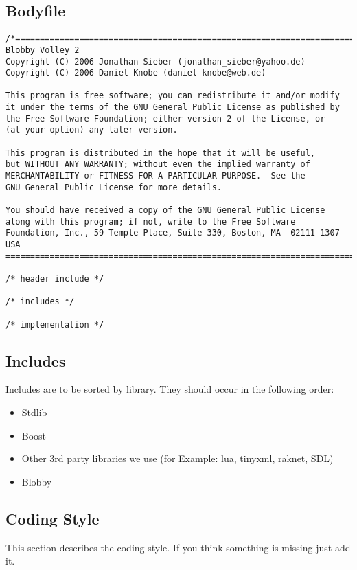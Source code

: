 \documentclass[a4paper]{scrartcl}
\begin{document}
\subsection{Bodyfile}

\begin{lstlisting}
/*=============================================================================
Blobby Volley 2
Copyright (C) 2006 Jonathan Sieber (jonathan_sieber@yahoo.de)
Copyright (C) 2006 Daniel Knobe (daniel-knobe@web.de)

This program is free software; you can redistribute it and/or modify
it under the terms of the GNU General Public License as published by
the Free Software Foundation; either version 2 of the License, or
(at your option) any later version.

This program is distributed in the hope that it will be useful,
but WITHOUT ANY WARRANTY; without even the implied warranty of
MERCHANTABILITY or FITNESS FOR A PARTICULAR PURPOSE.  See the
GNU General Public License for more details.

You should have received a copy of the GNU General Public License
along with this program; if not, write to the Free Software
Foundation, Inc., 59 Temple Place, Suite 330, Boston, MA  02111-1307  USA
=============================================================================*/

/* header include */

/* includes */

/* implementation */
\end{lstlisting}


\subsection{Includes}
Includes are to be sorted by library. They should occur in the following order:
\begin{itemize}
	\item Stdlib
	\item Boost
	\item Other 3rd party libraries we use (for Example: lua, tinyxml, raknet, SDL)
	\item Blobby
\end{itemize}



\subsection{Coding Style}
This section describes the coding style. If you think something is missing just add it.
\end{document}
